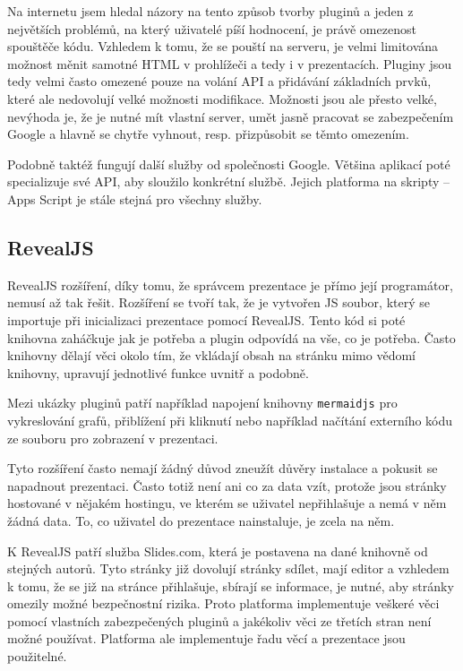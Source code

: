 Na internetu jsem hledal názory na tento způsob tvorby pluginů a jeden z největších problémů, na který uživatelé píší hodnocení, je právě omezenost spouštěče kódu.
Vzhledem k tomu, že se pouští na serveru, je velmi limitována možnost měnit samotné HTML v prohlížeči a tedy i v prezentacích.
Pluginy jsou tedy velmi často omezené pouze na volání API a přidávání základních prvků, které ale nedovolují velké možnosti modifikace.
Možnosti jsou ale přesto velké, nevýhoda je, že je nutné mít vlastní server, umět jasně pracovat se zabezpečením Google a hlavně se chytře vyhnout, resp. přizpůsobit se těmto omezením.

Podobně taktéž fungují další služby od společnosti Google.
Většina aplikací poté specializuje své API, aby sloužilo konkrétní službě.
Jejich platforma na skripty -- Apps Script je stále stejná pro všechny služby.

\subsection{RevealJS}

RevealJS rozšíření, díky tomu, že správcem prezentace je přímo její programátor, nemusí až tak řešit.
Rozšíření se tvoří tak, že je vytvořen JS soubor, který se importuje při inicializaci prezentace pomocí RevealJS.
Tento kód si poté knihovna zaháčkuje jak je potřeba a plugin odpovídá na vše, co je potřeba.
Často knihovny dělají věci okolo tím, že vkládají obsah na stránku mimo vědomí knihovny, upravují jednotlivé funkce uvnitř a podobně.

Mezi ukázky pluginů patří například napojení knihovny \texttt{mermaidjs} pro vykreslování grafů, přiblížení při kliknutí nebo například načítání externího kódu ze souboru pro zobrazení v prezentaci.

Tyto rozšíření často nemají žádný důvod zneužít důvěry instalace a pokusit se napadnout prezentaci.
Často totiž není ani co za data vzít, protože jsou stránky hostované v nějakém hostingu, ve kterém se uživatel nepřihlašuje a nemá v něm žádná data.
To, co uživatel do prezentace nainstaluje, je zcela na něm.

K RevealJS patří služba Slides.com, která je postavena na dané knihovně od stejných autorů.
Tyto stránky již dovolují stránky sdílet, mají editor a vzhledem k tomu, že se již na stránce přihlašuje, sbírají se informace, je nutné, aby stránky omezily možné bezpečnostní rizika.
Proto platforma implementuje veškeré věci pomocí vlastních zabezpečených pluginů a jakékoliv věci ze třetích stran není možné používat.
Platforma ale implementuje řadu věcí a prezentace jsou použitelné.


